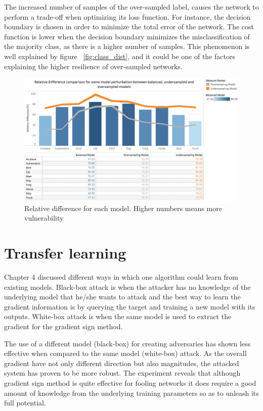 The increased number of samples of the over-sampled label, causes the network to perform a trade-off when optimizing its loss function. For instance, the decision boundary is chosen in order to minimize the total error of the network. The cost function is lower when the decision boundary minimizes the misclassification of the majority class, as there is a higher number of samples. This phenomenon is well explained by figure ~\ref{fig:class_dist}, and it could be one of the factors explaining the higher resilience of over-sampled networks.

\begin{figure}[H]
	\centering
	\includegraphics[scale=0.3]{rel_diff_graph.png}
	\caption{Relative difference for each model. Higher numbers means more vulnerability}
	\label{fig:relative_difference}
\end{figure}

\section{Transfer learning}

Chapter 4 discussed different ways in which one algorithm could learn from existing models. Black-box attack is when the attacker has no knowledge of the underlying model that he/she wants to attack and the best way to learn the gradient information is by querying the target and training a new model with its outputs. White-box attack is when the same model is used to extract the gradient for the gradient sign method.

The use of a different model (black-box) for creating adversaries has shown less effective when compared to the same model (white-box) attack. As the overall gradient have not only different direction but also magnitudes, the attacked system has proven to be more robust. The experiment reveals that although gradient sign method is quite effective for fooling networks it does require a good amount of knowledge from the underlying training parameters so as to unleash its full potential.

